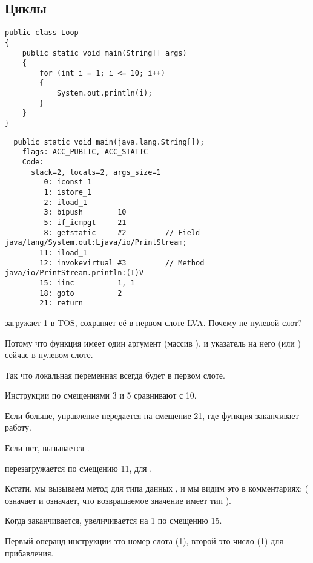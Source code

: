 \subsection{Циклы}

\begin{lstlisting}[style=customjava]
public class Loop
{
	public static void main(String[] args)
	{ 
		for (int i = 1; i <= 10; i++)
		{
			System.out.println(i); 
		}               
	}
}
\end{lstlisting}

\begin{lstlisting}
  public static void main(java.lang.String[]);
    flags: ACC_PUBLIC, ACC_STATIC
    Code:
      stack=2, locals=2, args_size=1
         0: iconst_1      
         1: istore_1      
         2: iload_1       
         3: bipush        10
         5: if_icmpgt     21
         8: getstatic     #2         // Field java/lang/System.out:Ljava/io/PrintStream;
        11: iload_1       
        12: invokevirtual #3         // Method java/io/PrintStream.println:(I)V
        15: iinc          1, 1
        18: goto          2
        21: return        
\end{lstlisting}


 загружает 1 в \ac{TOS},  сохраняет её в первом слоте \ac{LVA}.
Почему не нулевой слот?

Потому что функция \main имеет один аргумент (массив ),
и указатель на него (или ) сейчас в нулевом слоте.


Так что локальная переменная  всегда будет в первом слоте.


Инструкции по смещениями 3 и 5 сравнивают  с 10.

Если  больше, управление передается на смещение 21, где функция заканчивает работу.

Если нет, вызывается .

 перезагружается по смещению 11, для .

Кстати, мы вызываем метод  для типа данных , 
и мы видим это в комментариях: 
( означает  и  означает, что возвращаемое значение имеет тип ).


Когда  заканчивается,  увеличивается на 1 по смещению 15.

Первый операнд инструкции это номер слота (1), 
второй это число (1) для прибавления.


